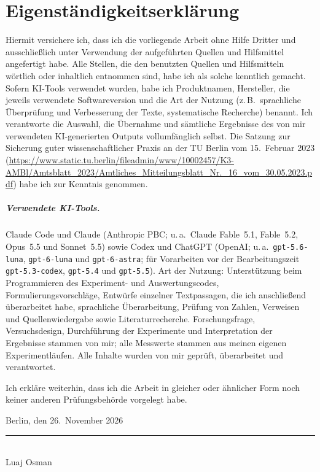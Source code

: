 \chapter*{Eigenständigkeitserklärung}
\thispagestyle{plain}

Hiermit versichere ich, dass ich die vorliegende Arbeit ohne Hilfe Dritter
und ausschließlich unter Verwendung der aufgeführten Quellen und Hilfsmittel
angefertigt habe.
Alle Stellen, die den benutzten Quellen und Hilfsmitteln wörtlich oder
inhaltlich entnommen sind, habe ich als solche kenntlich gemacht.
Sofern KI-Tools verwendet wurden, habe ich Produktnamen, Hersteller, die
jeweils verwendete Softwareversion und die Art der Nutzung (z.\,B.\
sprachliche Überprüfung und Verbesserung der Texte, systematische
Recherche) benannt.
Ich verantworte die Auswahl, die Übernahme und sämtliche Ergebnisse des von
mir verwendeten KI-generierten Outputs vollumfänglich selbst.
Die Satzung zur Sicherung guter wissenschaftlicher Praxis an der TU Berlin
vom 15.~Februar 2023
(\url{https://www.static.tu.berlin/fileadmin/www/10002457/K3-AMBl/Amtsblatt_2023/Amtliches_Mitteilungsblatt_Nr._16_vom_30.05.2023.pdf})
habe ich zur Kenntnis genommen.

\paragraph{Verwendete KI-Tools.}
Claude Code und Claude (Anthropic PBC; u.\,a.\ Claude Fable~5.1, Fable~5.2,
Opus~5.5 und Sonnet~5.5) sowie Codex und ChatGPT (OpenAI; u.\,a.\
\texttt{gpt-5.6-luna}, \texttt{gpt-6-luna} und \texttt{gpt-6-astra}; für
Vorarbeiten vor der Bearbeitungszeit \texttt{gpt-5.3-codex}, \texttt{gpt-5.4}
und \texttt{gpt-5.5}).
Art der Nutzung: Unterstützung beim Programmieren des Experiment- und
Auswertungscodes, Formulierungsvorschläge, Entwürfe einzelner
Textpassagen, die ich anschließend überarbeitet habe, sprachliche
Überarbeitung, Prüfung von Zahlen, Verweisen und Quellenwiedergabe sowie
Literaturrecherche.
Forschungsfrage, Versuchsdesign, Durchführung der Experimente und
Interpretation der Ergebnisse stammen von mir; alle Messwerte stammen aus
meinen eigenen Experimentläufen.
Alle Inhalte wurden von mir geprüft, überarbeitet und verantwortet.

\vspace{0.8cm}

Ich erkläre weiterhin, dass ich die Arbeit in gleicher oder ähnlicher Form
noch keiner anderen Prüfungsbehörde vorgelegt habe.

\vspace{2cm}

\noindent Berlin, den 26.~November 2026\hfill\rule{6.5cm}{0.4pt}\\[0.2cm]
\hspace*{\fill}Luaj Osman
